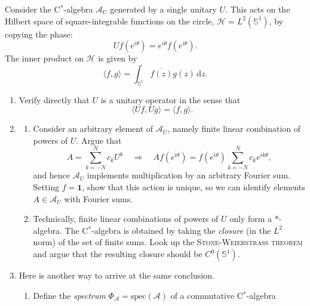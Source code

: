 \noindent
Consider the C${}^*$-algebra $\mathcal{A}_U$ generated by a single unitary $U$.
  This acts on the Hilbert space of square-integrable functions on the
  circle, $\mathcal{H} = L^2(\mathbb{S}^1)$, by copying the phase:
  \[
    U f(e^{i\theta}) = e^{i\theta}f(e^{i\theta}).
  \]
  The inner product on $\mathcal{H}$ is given by
  \[
    \langle f, g\rangle = \int_{\mathbb{S}^1} 
    \overline{f(z)} g(z)\, \mathrm{d}z.
  \]
\begin{enumerate}[label=(\alph*), itemsep=-1pt]
  \item Verify directly that $U$ is a unitary operator in the sense
    that
    \[
      \langle U f, U g\rangle = \langle f, g\rangle.
    \]
  \item
        \begin{enumerate}[label=\roman*., itemsep=-1pt] 
        \item Consider an arbitrary element of $\mathcal{A}_U$, namely
    finite linear combination of powers of $U$.
    Argue that
    \[
      A = \sum_{k=-N}^N c_k U^k \quad \Longrightarrow \quad A
      f(e^{i\theta}) = f(e^{i\theta})\sum_{k=-N}^N c_k e^{ik\theta},
    \]
    and hence $\mathcal{A}_U$ implements multiplication by an
    arbitrary Fourier sum. Setting $f = \mathbf{1}$, show that this
    action is unique, so we can identify elements $A\in \mathcal{A}_U$
    with Fourier sums.  %
  \item Technically, finite linear combinations of powers of $U$ only
    form a $*$-algebra.  %
    The C${}^*$-algebra is obtained by taking the \emph{closure} (in
    the $L^2$ norm) of the set of finite sums. Look up the
    \textsc{Stone-Weierstrass theorem} and argue that the resulting
    closure should be $C^0(\mathbb{S}^1)$.
          \end{enumerate}
  \item Here is another way to arrive at the same conclusion.
    \begin{enumerate}[label=\roman*., itemsep=-1pt]
    \item Define the \emph{spectrum}  $\Phi_\mathcal{A}=\text{spec}(\mathcal{A})$ of a commutative C${}^*$-algebra

\end{enumerate}
\end{enumerate}
